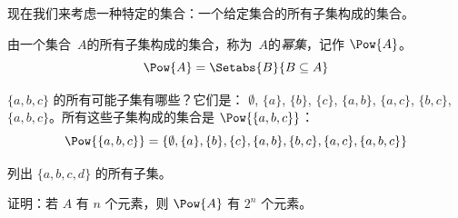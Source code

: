 \documentclass[../../../include/open-logic-section]{subfiles}
\begin{document}
现在我们来考虑一种特定的集合：一个给定集合的所有子集构成的集合。

\begin{defn}[幂集]
由一个集合~$A$的所有子集构成的集合，称为~$A$的\emph{幂集}，记作 $\Pow{A}$。
  \[
    \Pow{A} = \Setabs{B}{B \subseteq A}
  \]
\end{defn}

\begin{ex}
$\{ a, b, c \}$ 的所有可能子集有哪些？它们是：
$\emptyset$, $\{a \}$, $\{b\}$, $\{c\}$, $\{a, b\}$, $\{a, c\}$, $\{b,
c\}$, $\{a, b, c\}$。所有这些子集构成的集合是
$\Pow{\{a,b,c\}}$：
\[
\Pow{\{ a, b, c \}} = \{\emptyset, \{a \}, \{b\}, \{c\}, \{a, b\},
\{b, c\}, \{a, c\}, \{a, b, c\}\}
\]
\end{ex}

\begin{prob}
列出 $\{a, b, c, d\}$ 的所有子集。
\end{prob}

\begin{prob}
证明：若 $A$ 有 $n$ 个元素，则 $\Pow{A}$ 有 $2^n$ 个元素。
\end{prob}
\end{document}

